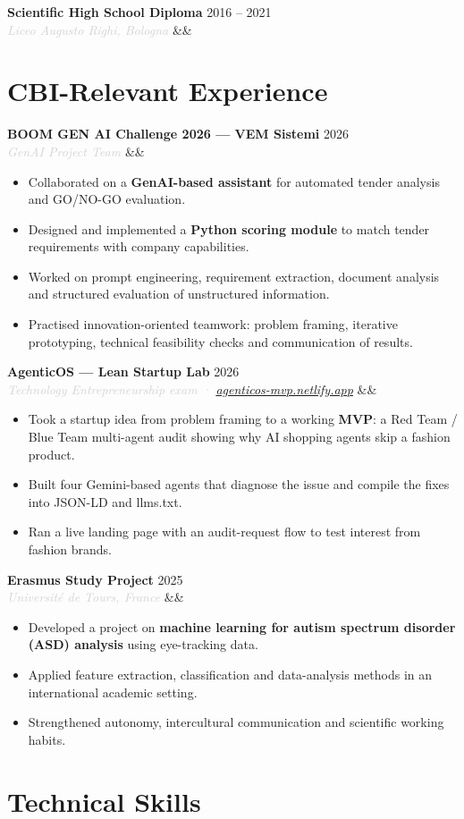 \documentclass[a4paper,10pt]{article}
\newcommand{\entry}[4]{%
  \noindent\textbf{#1} \hfill \textcolor{accent}{#2}\\
  \textit{\textcolor{lightgray}{#3}}%
  \ifx&#4&\else\\\vspace{0.2em}#4\fi
  \vspace{0.5em}
}
\newcommand{\entrylist}[5]{%
  \noindent\textbf{#1} \hfill \textcolor{accent}{#2}\\
  \textit{\textcolor{lightgray}{#3}}%
  \ifx&#4&\else\\\vspace{0.2em}#4\fi
  \vspace{0.25em}
  \begin{itemize}#5\end{itemize}
  \vspace{0.25em}
}
\begin{document}
\entry{Scientific High School Diploma}{2016 -- 2021}{Liceo Augusto Righi, Bologna}{}

\section{CBI-Relevant Experience}

\entrylist{BOOM GEN AI Challenge 2026 — VEM Sistemi}{2026}{GenAI Project Team}{}{
  \item Collaborated on a \textbf{GenAI-based assistant} for automated tender analysis and GO/NO-GO evaluation.
  \item Designed and implemented a \textbf{Python scoring module} to match tender requirements with company capabilities.
  \item Worked on prompt engineering, requirement extraction, document analysis and structured evaluation of unstructured information.
  \item Practised innovation-oriented teamwork: problem framing, iterative prototyping, technical feasibility checks and communication of results.
}

\entrylist{AgenticOS — Lean Startup Lab}{2026}{Technology Entrepreneurship exam · \href{https://agenticos-mvp.netlify.app}{agenticos-mvp.netlify.app}}{}{
  \item Took a startup idea from problem framing to a working \textbf{MVP}: a Red Team / Blue Team multi-agent audit showing why AI shopping agents skip a fashion product.
  \item Built four Gemini-based agents that diagnose the issue and compile the fixes into JSON-LD and llms.txt.
  \item Ran a live landing page with an audit-request flow to test interest from fashion brands.
}

\entrylist{Erasmus Study Project}{2025}{Université de Tours, France}{}{
  \item Developed a project on \textbf{machine learning for autism spectrum disorder (ASD) analysis} using eye-tracking data.
  \item Applied feature extraction, classification and data-analysis methods in an international academic setting.
  \item Strengthened autonomy, intercultural communication and scientific working habits.
}

\section{Technical Skills}
\end{document}
